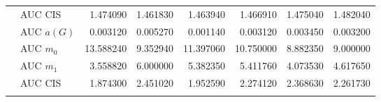 \begin{table}[htbp]
\begin{tabular}{llrrrrrr}
    & AUC CIS & 1.474090 & 1.461830 & 1.463940 & 1.466910 & 1.475040 & 1.482040 \\
    \addlinespace
    \multirow{4}{*}{random} & AUC $a(G)$ & 0.003120 & 0.005270 & 0.001140 & 0.003120 & 0.003450 & 0.003200 \\
    & AUC $m_0$ & 13.588240 & 9.352940 & 11.397060 & 10.750000 & 8.882350 & 9.000000 \\
    & AUC $m_1$ & 3.558820 & 6.000000 & 5.382350 & 5.411760 & 4.073530 & 4.617650 \\
    & AUC CIS & 1.874300 & 2.451020 & 1.952590 & 2.274120 & 2.368630 & 2.261730 \\
    \addlinespace
    \bottomrule
  \end{tabular}
\end{table}

